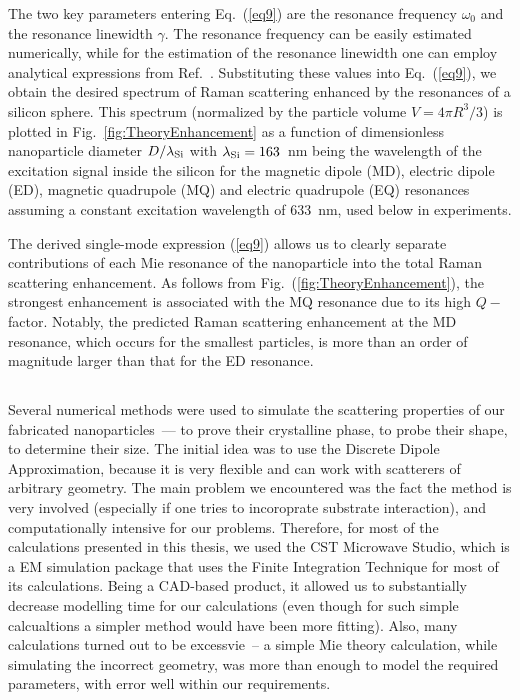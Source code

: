         The two key parameters entering Eq.~(\ref{eq9}) are the resonance frequency $\omega_0$ and the resonance linewidth $\gamma$.
        The resonance frequency can be easily estimated numerically, while for the estimation of the resonance linewidth one can
        employ analytical expressions from Ref.~\cite{lai1991effect}. Substituting these values into Eq.~(\ref{eq9}), we obtain the desired
        spectrum of Raman scattering enhanced by the resonances of a silicon sphere. This spectrum (normalized by the particle
        volume $V=4\pi R^3/3$) is plotted in Fig.~\ref{fig:TheoryEnhancement} as a  function of dimensionless nanoparticle diameter $D/\lambda_{\rm Si}$
        with $\lambda_{\rm Si}=163$~nm being the wavelength of the excitation signal inside the silicon for the magnetic dipole (MD), electric dipole (ED),
        magnetic quadrupole (MQ) and electric quadrupole (EQ) resonances assuming a constant excitation wavelength of 633~nm,
        used below in experiments.

        The derived single-mode expression (\ref{eq9}) allows us to clearly separate contributions of each Mie resonance of the
        nanoparticle into the total Raman scattering enhancement. As follows from Fig.~(\ref{fig:TheoryEnhancement}), the strongest enhancement
        is associated with the MQ resonance due to its high $Q-$factor. Notably, the predicted Raman scattering enhancement
        at the MD resonance, which occurs for the smallest particles, is more than an order of magnitude larger than that for
        the ED resonance.


    \subsection{}
    \label{sec:Numeric}
        Several numerical methods were used to simulate the scattering properties of our fabricated nanoparticles~--- to prove their
        crystalline phase, to probe their shape, to determine their size. The initial idea was to use the Discrete Dipole Approximation,
        because it is very flexible and can work with scatterers of arbitrary geometry. The main problem we encountered was the fact
        the method is very involved (especially if one tries to incoroprate substrate interaction), and computationally intensive for
        our problems. Therefore, for most of the calculations presented in this thesis, we used the CST Microwave Studio, which is a
        EM simulation package that uses the Finite Integration Technique for most of its calculations. Being a CAD-based product, it
        allowed us to substantially decrease modelling time for our calculations (even though for such simple calcualtions a simpler
        method would have been more fitting). Also, many calculations turned out to be excessvie~-- a simple Mie theory calculation,
        while simulating the incorrect geometry, was more than enough to model the required parameters, with error well within our
        requirements.

